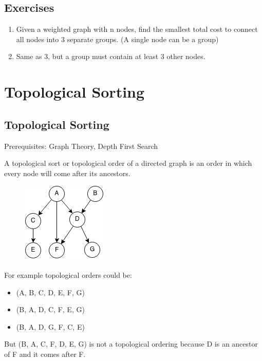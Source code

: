 \documentclass[11pt,oneside]{book}
\makeatletter
\def\maxwidth#1{\ifdim\Gin@nat@width>#1 #1\else\Gin@nat@width\fi}
\makeatother
\begin{document}
        \section{ Exercises }
        

\begin{enumerate}
\item Given a weighted graph with n nodes, find the smallest total cost to connect all nodes into 3 separate groups. (A single node can be a group)
\item Same as 3, but a group must contain at least 3 other nodes.
\end{enumerate}

    \chapter{ Topological Sorting }
        \section{ Topological Sorting }
        

Prerequisites: Graph Theory, Depth First Search

A topological sort or topological order of a directed graph is an order in which every node will come after its ancestors.

\vspace{5px}\begin{figure}[H]\centering
        \includegraphics[width=0.66\maxwidth{\textwidth}]{topsort.png}
        \end{figure}

For example topological orders could be:

\begin{itemize}
\item (A, B, C, D, E, F, G)
\item (B, A, D, C, F, E, G)
\item (B, A, D, G, F, C, E)
\end{itemize}

But (B, A, C, F, D, E, G) is not a topological ordering because D is an ancestor of F and it comes after F.
\end{document}
